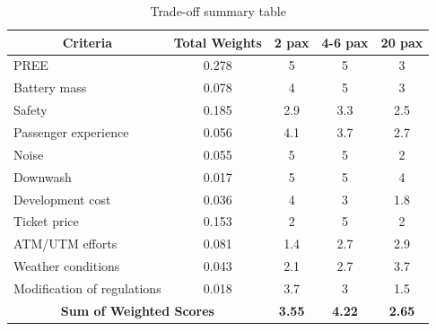 \begin{table}[H]
\centering
\captionsetup{justification=centering}
\caption{Trade-off summary table}
\label{TO-summary}
\begin{tabular}{lcccc}
\hline
\multicolumn{1}{c}{\textbf{Criteria}} & \multicolumn{1}{l}{\textbf{Total Weights}} & \multicolumn{1}{r}{\textbf{2 pax}} & \multicolumn{1}{l}{\textbf{4-6 pax}} & \multicolumn{1}{l}{\textbf{20 pax}} \\ \hline
PREE & 0.278 & \cellcolor[HTML]{E6FFE5}5 & \cellcolor[HTML]{E6FFE5}5 & 3 \\
Battery mass & 0.078 & 4 & \cellcolor[HTML]{E6FFE5}5 & 3 \\
Safety & 0.185 & 2.9 & \cellcolor[HTML]{E6FFE5}3.3 & 2.5 \\
Passenger experience & 0.056 & \cellcolor[HTML]{E6FFE5}4.1 & 3.7 & 2.7 \\
Noise & 0.055 & \cellcolor[HTML]{E6FFE5}5 & \cellcolor[HTML]{E6FFE5}5 & 2 \\
Downwash & 0.017 & \cellcolor[HTML]{E6FFE5}5 & \cellcolor[HTML]{E6FFE5}5 & 4 \\
Development cost & 0.036 & \cellcolor[HTML]{E6FFE5}4 & 3 & 1.8 \\
Ticket price & 0.153 & 2 & \cellcolor[HTML]{E6FFE5}5 & 2 \\
ATM/UTM efforts & 0.081 & 1.4 & 2.7 & \cellcolor[HTML]{E6FFE5}2.9 \\
Weather conditions & 0.043 & 2.1 & 2.7 & \cellcolor[HTML]{E6FFE5}3.7 \\
Modification of regulations & 0.018 & \cellcolor[HTML]{E6FFE5}3.7 & 3 & 1.5 \\ \hline
\multicolumn{2}{c}{\textbf{Sum of Weighted Scores}} & \cellcolor[HTML]{FFFC9E}\textbf{3.55} & \cellcolor[HTML]{67FD9A}\textbf{4.22} & \cellcolor[HTML]{FD6864}\textbf{2.65} \\ \hline
\end{tabular}
\end{table}


